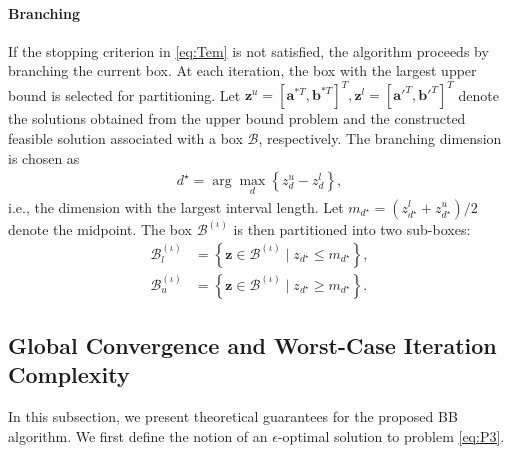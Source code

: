 \documentclass[runningheads]{llncs}
\begin{document}
\paragraph{Branching}
If the stopping criterion in \eqref{eq:Tem} is not satisfied, the algorithm proceeds by branching the current box. At each iteration, the box with the largest upper bound is selected for partitioning. 
Let $ \mathbf{z}^u = [\mathbf{a}^{*T}, \mathbf{b}^{*T}]^T, \mathbf{z}^l = [\mathbf{a}'^T, \mathbf{b}'^T]^T$ denote the solutions obtained from the upper bound problem and the constructed feasible solution  associated with a box $\mathcal{B}$, respectively. The branching dimension is chosen as
\begin{align}
d^\star = \arg\max_{d} \left\{ z_d^{u} - z_d^{l} \right\},
\end{align}
i.e., the dimension with the largest interval length. Let $m_{d^\star} = \left( z_{d^\star}^{l} + z_{d^\star}^{u} \right)/2$ denote the midpoint. The box $\mathcal{B}^{(\iota)}$ is then partitioned into two sub-boxes:
\begin{subequations}
\label{eq:Branch}
\begin{align}
\mathcal{B}_l^{(\iota)} &= \left\{ \mathbf{z} \in \mathcal{B}^{(\iota)} \mid z_{d^\star} \le m_{d^\star} \right\}, \\
\mathcal{B}_u^{(\iota)} &= \left\{ \mathbf{z} \in \mathcal{B}^{(\iota)} \mid z_{d^\star} \ge m_{d^\star} \right\}.
\end{align}
\end{subequations}

\subsection{Global Convergence and Worst-Case Iteration Complexity}

In this subsection, we present theoretical guarantees for the proposed BB algorithm. We first define the notion of an $\epsilon$-optimal solution to problem \eqref{eq:P3}.
\end{document}
